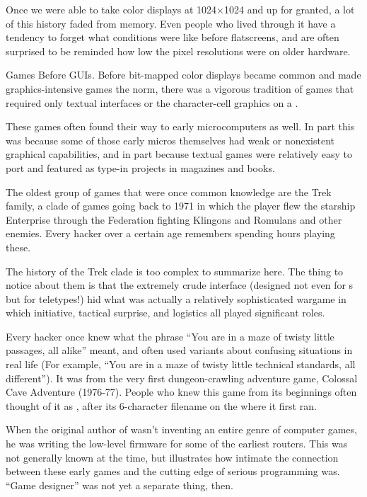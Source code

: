 Once we were able to take color displays at 1024$\times$1024 and up for granted, a lot
of this history faded from memory. Even people who lived through it have a
tendency to forget what conditions were like before flatscreens, and are often
surprised to be reminded how low the pixel resolutions were on older hardware.

\sect Games Before GUIs.
Before bit-mapped color displays became common and made graphics-intensive
games the norm, there was a vigorous tradition of games that required only
textual interfaces or the character-cell graphics on a .

These  games often found their way to early microcomputers as well. In part
this was because some of those early micros themselves had weak or nonexistent
graphical capabilities, and in part because textual games were relatively easy
to port and featured as type-in projects in magazines and books.

The oldest group of games that were once common knowledge are the Trek family,
a clade of games going back to 1971 in which the player flew the starship
Enterprise through the Federation fighting Klingons and Romulans and other
enemies. Every hacker over a certain age remembers spending hours playing
these.

The history of the Trek clade is too complex to summarize here. The thing to
notice about them is that the extremely crude interface (designed not even for
s but for teletypes!) hid what was actually a relatively sophisticated
wargame in which initiative, tactical surprise, and logistics all played
significant roles.

Every hacker once knew what the phrase ``You are in a maze of twisty little
passages, all alike'' meant, and often used variants about confusing situations
in real life (For example, ``You are in a maze of twisty little technical
standards, all different''). It was from the very first dungeon-crawling
adventure game, Colossal Cave Adventure (1976-77). People who knew this game
from its beginnings often thought of it as , after its 6-character
filename on the  where it first ran.

When the original author of  wasn't inventing an entire genre of computer
games, he was writing the low-level firmware for some of the earliest 
routers. This was not generally known at the time, but illustrates how intimate
the connection between these early games and the cutting edge of serious
programming was. ``Game designer'' was not yet a separate thing, then.

